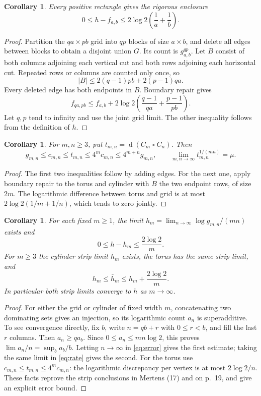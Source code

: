 \documentclass[11pt]{article}
\newtheorem{corollary}[theorem]{Corollary}
\newcommand{\ds}{\operatorname{d}}
\begin{document}
\begin{corollary}\label{cor:error}
Every positive rectangle gives the rigorous enclosure
\begin{equation}\label{eq:error}
 0\le h-f_{a,b}\le2\log2\left(\frac1a+\frac1b\right).
\end{equation}
\end{corollary}
\begin{proof}
Partition the $qa\times pb$ grid into $qp$ blocks of size $a\times b$,
and delete all edges between blocks to obtain a disjoint union $G$.
Its count is $g_{a,b}^{qp}$. Let $B$ consist of both columns adjoining
each vertical cut and both rows adjoining each horizontal cut. Repeated
rows or columns are counted only once, so
\[
 |B|\le 2(q-1)pb+2(p-1)qa.
\]
Every deleted edge has both endpoints in $B$. Boundary repair gives
\[
 f_{qa,pb}\le f_{a,b}
 +2\log2\left(\frac{q-1}{qa}+\frac{p-1}{pb}\right).
\]
Let $q,p$ tend to infinity and use the joint grid limit. The other
inequality follows from the definition of $h$.
\end{proof}

\begin{corollary}\label{cor:torus}
For $m,n\ge3$, put $t_{m,n}=\ds(C_m\mathbin\square C_n)$. Then
\[
 g_{m,n}\le c_{m,n}\le t_{m,n}\le4^m c_{m,n}
 \le4^{m+n}g_{m,n},\qquad
 \lim_{m,n\to\infty}t_{m,n}^{1/(mn)}=\mu.
\]
\end{corollary}
\begin{proof}
The first two inequalities follow by adding edges. For the next one,
apply boundary repair to the torus and cylinder with $B$ the two
endpoint rows, of size $2m$. The logarithmic difference between torus
and grid is at most $2\log2(1/m+1/n)$, which tends to zero jointly.
\end{proof}

\begin{corollary}\label{cor:strip}
For each fixed $m\ge1$, the limit
$h_m=\lim_{n\to\infty}\log g_{m,n}/(mn)$ exists and
\[
 0\le h-h_m\le \frac{2\log2}{m}.
\]
For $m\ge3$ the cylinder strip limit $\bar h_m$ exists, the torus
has the same strip limit, and
\[
 h_m\le\bar h_m\le h_m+\frac{2\log2}{m}.
\]
In particular both strip limits converge to $h$ as $m\to\infty$.
\end{corollary}
\begin{proof}
For either the grid or cylinder of fixed width $m$, concatenating two
dominating sets gives an injection, so its logarithmic count $a_n$ is
superadditive. To see convergence directly, fix $b$, write $n=qb+r$
with $0\le r<b$, and fill the last $r$ columns. Then $a_n\ge q a_b$.
Since $0\le a_n\le mn\log2$, this proves
$\lim a_n/n=\sup_b a_b/b$. Letting $n\to\infty$ in
\eqref{eq:error} gives the first estimate; taking the same limit in
\eqref{eq:rate} gives the second. For the torus use
$c_{m,n}\le t_{m,n}\le4^m c_{m,n}$: the logarithmic discrepancy per
vertex is at most $2\log2/n$. These facts reprove the strip conclusions
in Mertens (17) and on p.~19, and give an explicit error bound.
\end{proof}
\end{document}
